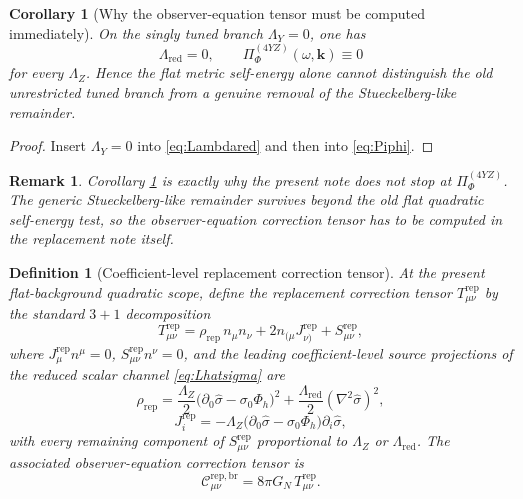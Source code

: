 \documentclass[11pt]{article}
\newtheorem{definition}{Definition}
\newtheorem{remark}{Remark}
\newtheorem{corollary}{Corollary}
\begin{document}
\begin{corollary}[Why the observer-equation tensor must be computed immediately]
\label{cor:needtensor}
On the singly tuned branch \(\Lambda_Y=0\), one has
\begin{equation}
\Lambda_{\mathrm{red}}=0,
\qquad
\Pi_{\Phi}^{(4YZ)}(\omega,\mathbf{k})\equiv 0
\label{eq:Pizero}
\end{equation}
for every \(\Lambda_Z\). Hence the flat metric self-energy alone cannot distinguish the old unrestricted tuned branch from a genuine removal of the Stueckelberg-like remainder.
\end{corollary}

\begin{proof}
Insert \(\Lambda_Y=0\) into \eqref{eq:Lambdared} and then into \eqref{eq:Piphi}.
\end{proof}

\begin{remark}
Corollary \ref{cor:needtensor} is exactly why the present note does not stop at \(\Pi_{\Phi}^{(4YZ)}\). The generic Stueckelberg-like remainder survives beyond the old flat quadratic self-energy test, so the observer-equation correction tensor has to be computed in the replacement note itself.
\end{remark}

\begin{definition}[Coefficient-level replacement correction tensor]
\label{def:Trep}
At the present flat-background quadratic scope, define the \emph{replacement correction tensor} \(T_{\mu\nu}^{\mathrm{rep}}\) by the standard \(3+1\) decomposition
\begin{equation}
T_{\mu\nu}^{\mathrm{rep}}
=
\rho_{\mathrm{rep}}\,n_\mu n_\nu
+2n_{(\mu}J_{\nu)}^{\mathrm{rep}}
+S_{\mu\nu}^{\mathrm{rep}},
\label{eq:Trep}
\end{equation}
where \(J_\mu^{\mathrm{rep}}n^\mu=0\), \(S_{\mu\nu}^{\mathrm{rep}}n^\nu=0\), and the leading coefficient-level source projections of the reduced scalar channel \eqref{eq:Lhatsigma} are
\begin{equation}
\rho_{\mathrm{rep}}
=
\frac{\Lambda_Z}{2}\bigl(\partial_0\hat\sigma-\sigma_0\Phi_h\bigr)^2
+\frac{\Lambda_{\mathrm{red}}}{2}(\nabla^2\hat\sigma)^2,
\label{eq:rhorep}
\end{equation}
\begin{equation}
J_i^{\mathrm{rep}}
=
-\Lambda_Z\bigl(\partial_0\hat\sigma-\sigma_0\Phi_h\bigr)\partial_i\hat\sigma,
\label{eq:Jrep}
\end{equation}
with every remaining component of \(S_{\mu\nu}^{\mathrm{rep}}\) proportional to \(\Lambda_Z\) or \(\Lambda_{\mathrm{red}}\). The associated observer-equation correction tensor is
\begin{equation}
\mathcal C_{\mu\nu}^{\mathrm{rep,br}}
=
8\pi G_N\,T_{\mu\nu}^{\mathrm{rep}}.
\label{eq:Crep}
\end{equation}
\end{definition}
\end{document}
